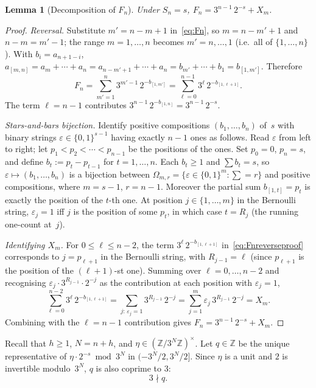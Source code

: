 \documentclass[11pt,a4paper]{amsart}
\theoremstyle{plain}
\newtheorem{lemma}[theorem]{Lemma}
\theoremstyle{definition}
\newcommand{\Z}{\mathbb{Z}}
\begin{document}
\begin{lemma}[Decomposition of $F_n$]\label{lem:Fdecomp}
Under $S_n=s$, $F_n=3^{n-1}\,2^{-s}+X_m$.
\end{lemma}

\begin{proof}
\emph{Reversal.}
Substitute $m'=n-m+1$ in~\eqref{eq:Fn}, so $m=n-m'+1$ and $n-m=m'-1$;
the range $m=1,\dots,n$ becomes $m'=n,\dots,1$ (i.e.\ all of $\{1,\dots,n\}$).
With $b_i=a_{n+1-i}$,
$a_{[m,n]}=a_m+\cdots+a_n=a_{n-m'+1}+\cdots+a_n=b_{m'}+\cdots+b_1=b_{[1,m']}$.
Therefore
\begin{equation}\label{eq:Fnreverseproof}
F_n=\sum_{m'=1}^n 3^{m'-1}\,2^{-b_{[1,m']}}=\sum_{\ell=0}^{n-1}3^\ell\,2^{-b_{[1,\ell+1]}}.
\end{equation}
The term $\ell=n-1$ contributes $3^{n-1}\,2^{-b_{[1,n]}}=3^{n-1}\,2^{-s}$.

\emph{Stars-and-bars bijection.}
Identify positive compositions $(b_1,\dots,b_n)$ of~$s$ with binary
strings $\varepsilon\in\{0,1\}^{s-1}$ having exactly $n-1$ ones as
follows.
Read $\varepsilon$ from left to right; let $p_1<p_2<\cdots<p_{n-1}$ be
the positions of the ones.
Set $p_0=0$, $p_n=s$, and define $b_t:=p_t-p_{t-1}$ for $t=1,\dots,n$.
Each $b_t\ge 1$ and $\sum b_t=s$, so $\varepsilon\mapsto(b_1,\dots,b_n)$
is a bijection between $\Omega_{m,r}=\{\varepsilon\in\{0,1\}^m:\sum=r\}$
and positive compositions, where $m=s-1$, $r=n-1$.
Moreover the partial sum $b_{[1,t]}=p_t$ is exactly the position of the
$t$-th one.
At position $j\in\{1,\dots,m\}$ in the Bernoulli string, $\varepsilon_j=1$
iff $j$ is the position of some $p_t$, in which case $t=R_j$ (the running
one-count at~$j$).

\emph{Identifying $X_m$.}
For $0\le\ell\le n-2$, the term $3^\ell\,2^{-b_{[1,\ell+1]}}$
in~\eqref{eq:Fnreverseproof} corresponds to $j=p_{\ell+1}$ in the
Bernoulli string, with $R_{j-1}=\ell$ (since $p_{\ell+1}$ is the position
of the $(\ell+1)$-st one).
Summing over $\ell=0,\dots,n-2$ and recognising
$\varepsilon_j\cdot 3^{R_{j-1}}\cdot 2^{-j}$ as the contribution at each
position with $\varepsilon_j=1$,
$$
\sum_{\ell=0}^{n-2}3^\ell\,2^{-b_{[1,\ell+1]}}
=\sum_{j:\,\varepsilon_j=1}3^{R_{j-1}}\,2^{-j}
=\sum_{j=1}^m\varepsilon_j\,3^{R_{j-1}}\,2^{-j}=X_m.
$$
Combining with the $\ell=n-1$ contribution gives $F_n=3^{n-1}\,2^{-s}+X_m$.
\end{proof}

Recall that $h\ge1$, $N=n+h$, and $\eta\in(\Z/3^N\Z)^\times$.
Let $q\in\Z$ be the unique representative of $\eta\cdot 2^{-s}\bmod 3^N$
in $(-3^N/2,3^N/2]$.
Since $\eta$ is a unit and $2$ is invertible modulo~$3^N$, $q$ is also coprime to $3$:
\begin{equation}\label{eq:qprime}
3\nmid q.
\end{equation}
\end{document}
